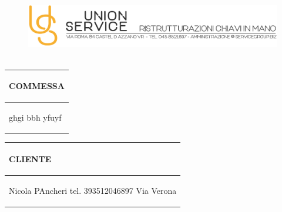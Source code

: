 \documentclass[a4paper]{article}
\begin{document}
                        \begin{figure}[!t]
                        \includegraphics[width=15.8cm, height=3cm]{intestazioneAlta2.jpg}
                        \end{figure}

                        \noindent\begin{tabular}{| L{72.2mm} |}
                            \hline
                            \vspace{2.5mm}
                            \begin{spacing}{0}
                            \textbf{COMMESSA}
                            \end{spacing}\\
                            \hline
                            \vspace{4mm}
                            \begin{spacing}{1.2}

                        ghgi \newline bbh \newline yfuyf
                          \end{spacing}\\
                            \hline
                          \end{tabular}
                          \quad
                          \begin{tabular}{ | R{72.2mm} | }
                            \hline
                            \vspace{2.5mm}
                            \begin{spacing}{0}
                            \textbf{CLIENTE}
                            \end{spacing}\\
                            \hline
                            \vspace{4mm}
                            \begin{spacing}{1.2}

                       Nicola PAncheri \newline tel. 393512046897 \newline Via Verona
                          \end{spacing}\\
                            \hline
                          \end{tabular}
\end{document}
